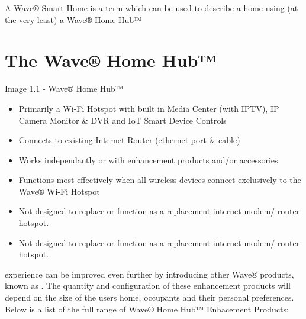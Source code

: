 \documentclass[letterpaper,10pt,english]{sphinxmanual}
\begin{document}
A Wave® Smart Home is a term which can be used to describe a home using (at the very least) a Wave® Home Hub™


\section{The Wave® Home Hub™}
\label{\detokenize{introduction:the-wave-home-hub}}
Image 1.1 - Wave® Home Hub™

\noindent{}

\begin{itemize}
\item {} 
Primarily a Wi-Fi Hotspot with built in Media Center (with IPTV), IP Camera Monitor \& DVR and IoT Smart Device Controls

\item {} 
Connects to existing Internet Router (ethernet port \& cable)

\item {} 
Works independantly or with enhancement products and/or accessories

\item {} 
Functions most effectively when all wireless devices connect exclusively to the Wave® Wi-Fi Hotspot

\item {} 
Not designed to replace or function as a replacement internet modem/ router hotspot.

\item {} 
Not designed to replace or function as a replacement internet modem/ router hotspot.

\end{itemize}

 experience can be improved even further by introducing other Wave® products, known as . The quantity and configuration of these enhancement products will depend on the size of the users home, occupants and their personal preferences. Below is a list of the full range of Wave® Home Hub™ Enhacement Products:
\end{document}
